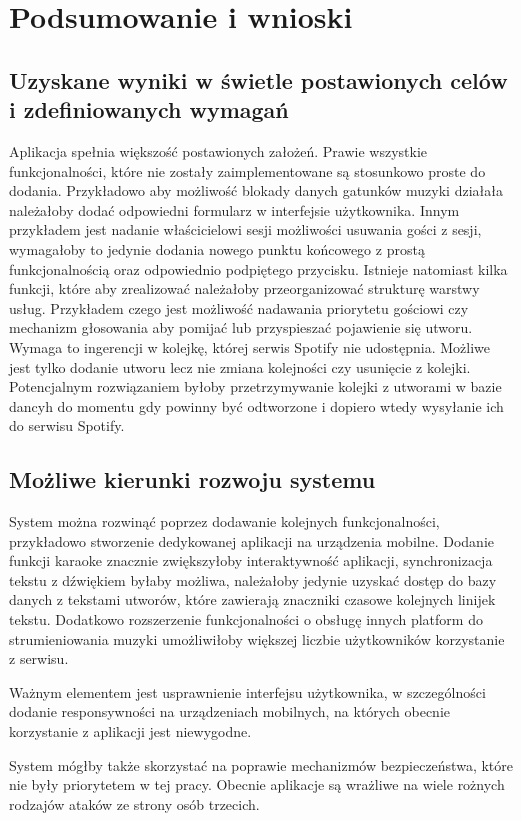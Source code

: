 \chapter{Podsumowanie i wnioski}
\section{Uzyskane wyniki w świetle postawionych celów i zdefiniowanych wymagań}
Aplikacja spełnia większość postawionych założeń. Prawie wszystkie funkcjonalności, które nie zostały zaimplementowane są stosunkowo proste do dodania. Przykładowo aby możliwość blokady danych gatunków muzyki działała należałoby dodać odpowiedni formularz w interfejsie użytkownika. Innym przykładem jest nadanie właścicielowi sesji możliwości usuwania gości z sesji, wymagałoby to jedynie dodania nowego punktu końcowego z prostą funkcjonalnością oraz odpowiednio podpiętego przycisku. Istnieje natomiast kilka funkcji, które aby zrealizować należałoby przeorganizować strukturę warstwy usług. Przykładem czego jest możliwość nadawania priorytetu gościowi czy mechanizm głosowania aby pomijać lub przyspieszać pojawienie się utworu. Wymaga to ingerencji w kolejkę, której serwis Spotify nie udostępnia. Możliwe jest tylko dodanie utworu lecz nie zmiana kolejności czy usunięcie z kolejki. Potencjalnym rozwiązaniem byłoby przetrzymywanie kolejki z utworami w bazie dancyh do momentu gdy powinny być odtworzone i dopiero wtedy wysyłanie ich do serwisu Spotify.

\section{Możliwe kierunki rozwoju systemu}
System można rozwinąć poprzez dodawanie kolejnych funkcjonalności, przykładowo stworzenie dedykowanej aplikacji na urządzenia mobilne. Dodanie funkcji karaoke znacznie zwiększyłoby interaktywność aplikacji, synchronizacja tekstu z dźwiękiem byłaby możliwa, należałoby jedynie uzyskać dostęp do bazy danych z tekstami utworów, które zawierają znaczniki czasowe kolejnych linijek tekstu. Dodatkowo rozszerzenie funkcjonalności o obsługę innych platform do strumieniowania muzyki umożliwiłoby większej liczbie użytkowników korzystanie z serwisu. 

Ważnym elementem jest usprawnienie interfejsu użytkownika, w szczególności dodanie responsywności na urządzeniach mobilnych, na których obecnie korzystanie z aplikacji jest niewygodne.

System mógłby także skorzystać na poprawie mechanizmów bezpieczeństwa, które nie były priorytetem w tej pracy. Obecnie aplikacje są wrażliwe na wiele rożnych rodzajów ataków ze strony osób trzecich. 

